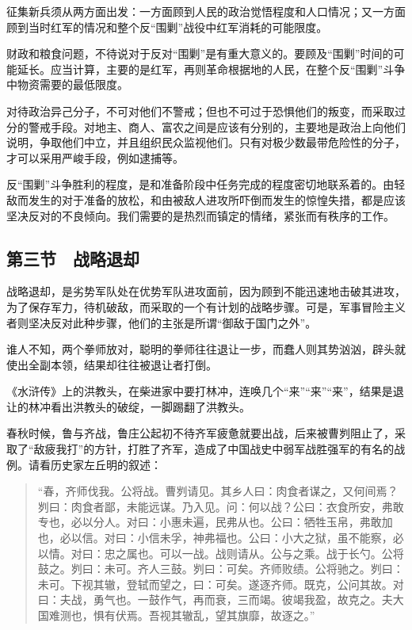 征集新兵须从两方面出发：一方面顾到人民的政治觉悟程度和人口情况；又一方面顾到当时红军的情况和整个反“围剿”战役中红军消耗的可能限度。

财政和粮食问题，不待说对于反对“围剿”是有重大意义的。要顾及“围剿”时间的可能延长。应当计算，主要的是红军，再则革命根据地的人民，在整个反“围剿”斗争中物资需要的最低限度。

对待政治异己分子，不可对他们不警戒；但也不可过于恐惧他们的叛变，而采取过分的警戒手段。对地主、商人、富农之间是应该有分别的，主要地是政治上向他们说明，争取他们中立，并且组织民众监视他们。只有对极少数最带危险性的分子，才可以采用严峻手段，例如逮捕等。

反“围剿”斗争胜利的程度，是和准备阶段中任务完成的程度密切地联系着的。由轻敌而发生的对于准备的放松，和由被敌人进攻所吓倒而发生的惊惶失措，都是应该坚决反对的不良倾向。我们需要的是热烈而镇定的情绪，紧张而有秩序的工作。

\subsection{第三节　战略退却}

战略退却，是劣势军队处在优势军队进攻面前，因为顾到不能迅速地击破其进攻，为了保存军力，待机破敌，而采取的一个有计划的战略步骤。可是，军事冒险主义者则坚决反对此种步骤，他们的主张是所谓“御敌于国门之外”。

谁人不知，两个拳师放对，聪明的拳师往往退让一步，而蠢人则其势汹汹，辟头就使出全副本领，结果却往往被退让者打倒。

《水浒传》上的洪教头，在柴进家中要打林冲，连唤几个“来”“来”“来”，结果是退让的林冲看出洪教头的破绽，一脚踢翻了洪教头。

春秋时候，鲁与齐战，鲁庄公起初不待齐军疲惫就要出战，后来被曹刿阻止了，采取了“敌疲我打”的方针，打胜了齐军，造成了中国战史中弱军战胜强军的有名的战例。请看历史家左丘明的叙述：

\begin{quote}
“春，齐师伐我。公将战。曹刿请见。其乡人曰：肉食者谋之，又何间焉？刿曰：肉食者鄙，未能远谋。乃入见。问：何以战？公曰：衣食所安，弗敢专也，必以分人。对曰：小惠未遍，民弗从也。公曰：牺牲玉帛，弗敢加也，必以信。对曰：小信未孚，神弗福也。公曰：小大之狱，虽不能察，必以情。对曰：忠之属也。可以一战。战则请从。公与之乘。战于长勺。公将鼓之。刿曰：未可。齐人三鼓。刿曰：可矣。齐师败绩。公将驰之。刿曰：未可。下视其辙，登轼而望之，曰：可矣。遂逐齐师。既克，公问其故。对曰：夫战，勇气也。一鼓作气，再而衰，三而竭。彼竭我盈，故克之。夫大国难测也，惧有伏焉。吾视其辙乱，望其旗靡，故逐之。”
\end{quote}

